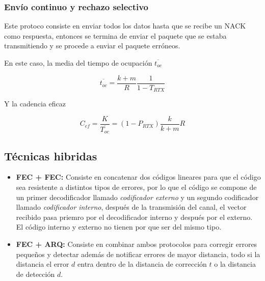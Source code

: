 \documentclass{article}
\begin{document}
\subsubsection{Envío continuo y rechazo selectivo}

Este protoco consiste en enviar todos los datos hasta que se recibe un NACK como respuesta, entonces se termina de enviar el paquete que se estaba transmitiendo y se procede a enviar el paquete erróneos.

En este caso, la media del tiempo de ocupación $\overline{t_{oc}}$

\begin{equation}
    \overline{t_{oc}} =
    \frac{k+m}{R}\frac{1}{1-T_{RTX}}
\end{equation}

Y la cadencia eficaz

\begin{equation}
    C_{ef} = \frac{K}{\overline{T_{oc}}} = (1-P_{RTX})\frac{k}{k+m}R
\end{equation}

\subsection{Técnicas hibridas}

\begin{itemize}
    \item \textbf{FEC + FEC:} Consiste en concatenar dos códigos lineares para que el código sea resistente a distintos tipos de errores, por lo que el código se compone de un primer decodificador llamado \textit{codificador externo} y un segundo codificador llamado \textit{codificador interno}, después de la transmisión del canal, el vector recibido pasa priemro por el decodificador interno y después por el externo. El código interno y externo no tienen por que ser del mismo tipo.
    \item \textbf{FEC + ARQ:} Consiste en combinar ambos protocolos para corregir errores pequeños y detectar además de notificar errores de mayor distancia, todo si la distancia el error $d$ entra dentro de la distancia de corrección $t$ o la distancia de detección $d$.
\end{itemize}
\end{document}
